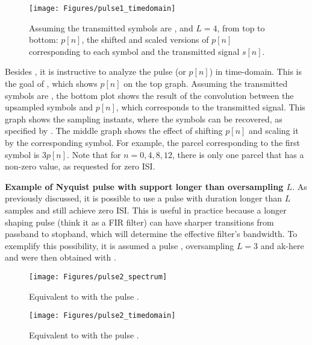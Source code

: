 \begin{figure}[htbp]
\centering
\texttt{[image: Figures/pulse1\_timedomain]}
\caption{Assuming the transmitted symbols are ,  and $L=4$, from top to bottom: $p[n]$, the shifted and scaled versions of $p[n]$ corresponding to each symbol and the transmitted signal $s[n]$.\label{fig:pulse1_timedomain}}
\end{figure}

Besides , it is instructive to analyze the pulse  (or $p[n]$) in time-domain. This is the goal of , which shows $p[n]$ on the top graph. Assuming the transmitted symbols are , the bottom plot shows the result of the convolution between the upsampled symbols and $p[n]$, which corresponds to the transmitted signal. This graph shows the sampling instants, where the symbols can be recovered, as specified by . The middle graph shows the effect of shifting $p[n]$ and scaling it by the corresponding symbol. For example, the parcel corresponding to the first symbol is $3 p[n]$. Note that for $n=0, 4, 8, 12$, there is only one parcel that has a non-zero value, as requested for zero ISI.
\eExample 

\bExample \textbf{Example of Nyquist pulse with support longer than oversampling $L$}.
As previously discussed, it is possible to use a pulse with duration longer than $L$ samples and still achieve zero ISI. This is useful in practice because a longer shaping pulse (think it as a FIR filter) can have sharper transitions from passband to stopband, which will determine the effective filter's bandwidth. To exemplify this possibility, it is assumed a pulse , oversampling $L=3$ and ak-here
 and  were then obtained with .

\begin{figure}[htbp]
\centering
\texttt{[image: Figures/pulse2\_spectrum]}
\caption{Equivalent to  with the pulse .\label{fig:pulse2_spectrum}}
\end{figure}

\begin{figure}[htbp]
\centering
\texttt{[image: Figures/pulse2\_timedomain]}
\caption{Equivalent to  with the pulse .\label{fig:pulse2_timedomain}}
\end{figure}

